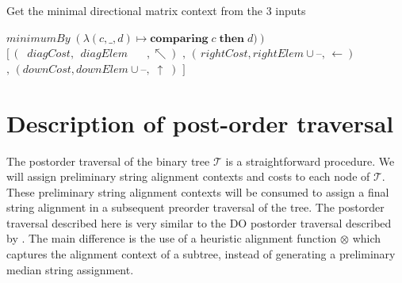 \documentclass[11pt]{article}
\begin{document}
\begin{algorithm}
  \caption{Get the minimal directional matrix context from the $3$ inputs}\label{getMinimal}
  \begin{algorithmic}[1]
      \State \Return $minimumBy \; \left(\lambda \left(c, \_, d \right) \mapsto \textbf{comparing}\; c \; \textbf{then} \; d)\right)$\newline\hspace*{3.85cm}
      $[\, \left(\;\;diagCost, \;\,diagElem   \quad\;\;\,   ,      \nwarrow    \right)$\newline\hspace*{3.85cm}
      $,\, \left(\, rightCost,    rightElem \cup \textbf{--}, \, \leftarrow    \right)$\newline\hspace*{3.85cm}
      $,\, \left(    downCost,     downElem \cup \textbf{--}, \;   \uparrow \; \right)$\newline\hspace*{3.85cm}
      $]$
    \EndFunction  
  \end{algorithmic}
\end{algorithm}


\section{Description of post-order traversal}
The postorder traversal of the binary tree $\mathcal{T}$ is a straightforward procedure.
We will assign preliminary string alignment contexts and costs to each node of $\mathcal{T}$.
These preliminary string alignment contexts will be consumed to assign a final string alignment in a subsequent preorder traversal of the tree.
The postorder traversal described here is very similar to the  DO postorder traversal described by \cite{Wheeler2003}.
The main difference is the use of a heuristic alignment function $\otimes$ which captures the alignment context of a subtree, instead of generating a preliminary median string assignment.
\end{document}
